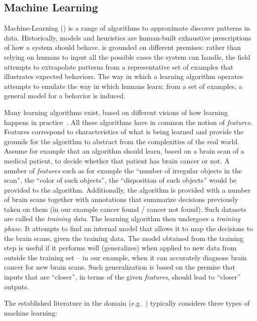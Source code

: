 \subsection{Machine Learning}

Machine-Learning (\ML) \cite{mitchell:1997} is a range of algorithms to
approximate discover patterns in data. Historically, models and heuristics are
human-built exhaustive prescriptions of how a system should behave. \ML is grounded on different premises:
rather than relying on humans to input all the possible cases the system can
handle, the field attempts to extrapolate patterns from a representative
set of examples that illustrates expected behaviors. The way in which a
learning algorithm operates attempts to emulate the way in which humans learn:
from a set of examples, a general model for a behavior is induced.

Many learning algorithms exist, based on different visions of how learning
happens in practice~\cite{Domingos:2015}. All these algorithms have in common
the notion of \emph{features}. Features correspond to characteristics of what is
being learned and provide the grounds for the algorithm to abstract from the
complexities of the real world. Assume for example that an algorithm should
learn, based on a brain scan of a medical patient, to decide whether that
patient has brain cancer or not. A number of \emph{features} such as for example
the ``number of irregular objects in the scan'', the ``color of such objects'',
the ``disposition of such objects'' would be provided to the algorithm.
Additionally, the algorithm is provided with a number of brain scans together
with annotations that summarize decisions previously taken on them (in our
example cancer found / cancer not found). Such datasets are called the
\emph{training data}.
The learning algorithm then undergoes a \emph{training phase}. It attempts to
find an internal model that allows it to map the decisions to the brain scans,
given the training data. The model obtained from the training step is useful if
it performs well (generalizes) when applied to new data from outside the training
set -- in our example, when it can accurately diagnose brain cancer for new
brain scans. Such generalization is based on the premise that inputs that are
``closer'', in terms of the given \emph{features}, should lead to ``closer''
outputs.

The established literature in the domain (e.g.~\cite{mitchell:1997}) typically
considers three types of machine learning:

